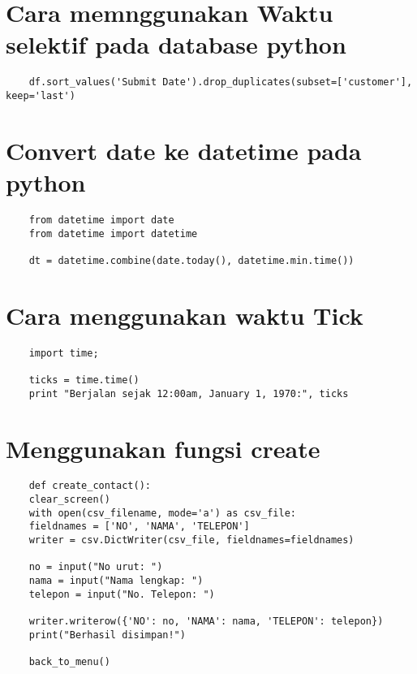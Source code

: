 \documentclass[12pt]{article} %
\begin{document}
\section{Cara memnggunakan Waktu selektif pada database python}
\begin{lstlisting}
	df.sort_values('Submit Date').drop_duplicates(subset=['customer'], keep='last')
\end{lstlisting}

\section {Convert date ke datetime pada python}
\begin{lstlisting}
	from datetime import date
	from datetime import datetime
		
	dt = datetime.combine(date.today(), datetime.min.time())
\end{lstlisting}

\section{Cara menggunakan waktu Tick}
\begin {lstlisting}
	import time; 
	
	ticks = time.time()
	print "Berjalan sejak 12:00am, January 1, 1970:", ticks
\end{lstlisting}
	
\section{Menggunakan fungsi create}
\begin{lstlisting}
	def create_contact():
	clear_screen()
	with open(csv_filename, mode='a') as csv_file:
	fieldnames = ['NO', 'NAMA', 'TELEPON']
	writer = csv.DictWriter(csv_file, fieldnames=fieldnames)
	
	no = input("No urut: ")
	nama = input("Nama lengkap: ")
	telepon = input("No. Telepon: ")
	
	writer.writerow({'NO': no, 'NAMA': nama, 'TELEPON': telepon})    
	print("Berhasil disimpan!")
	
	back_to_menu()
\end{lstlisting}
\end{document}

